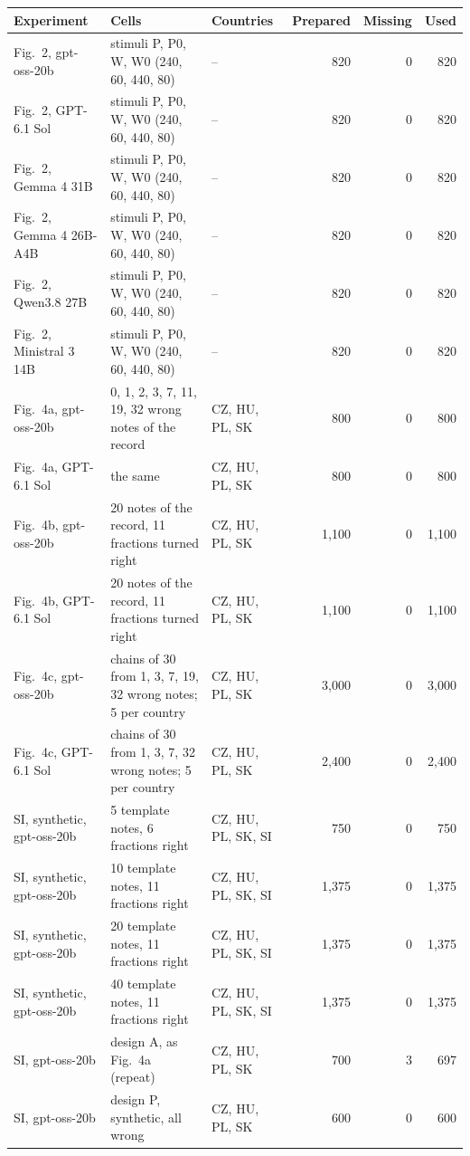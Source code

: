 \begin{tabular}{lp{5.4cm}lrrr}
\toprule
Experiment & Cells & Countries & Prepared & Missing & Used \\
\midrule
Fig.~2, gpt-oss-20b & stimuli P, P0, W, W0 (240, 60, 440, 80) & -- & 820 & 0 & 820 \\
Fig.~2, GPT-6.1 Sol & stimuli P, P0, W, W0 (240, 60, 440, 80) & -- & 820 & 0 & 820 \\
Fig.~2, Gemma 4 31B & stimuli P, P0, W, W0 (240, 60, 440, 80) & -- & 820 & 0 & 820 \\
Fig.~2, Gemma 4 26B-A4B & stimuli P, P0, W, W0 (240, 60, 440, 80) & -- & 820 & 0 & 820 \\
Fig.~2, Qwen3.8 27B & stimuli P, P0, W, W0 (240, 60, 440, 80) & -- & 820 & 0 & 820 \\
Fig.~2, Ministral 3 14B & stimuli P, P0, W, W0 (240, 60, 440, 80) & -- & 820 & 0 & 820 \\
Fig.~4a, gpt-oss-20b & 0, 1, 2, 3, 7, 11, 19, 32 wrong notes of the record & CZ, HU, PL, SK & 800 & 0 & 800 \\
Fig.~4a, GPT-6.1 Sol & the same & CZ, HU, PL, SK & 800 & 0 & 800 \\
Fig.~4b, gpt-oss-20b & 20 notes of the record, 11 fractions turned right & CZ, HU, PL, SK & 1,100 & 0 & 1,100 \\
Fig.~4b, GPT-6.1 Sol & 20 notes of the record, 11 fractions turned right & CZ, HU, PL, SK & 1,100 & 0 & 1,100 \\
Fig.~4c, gpt-oss-20b & chains of 30 from 1, 3, 7, 19, 32 wrong notes; 5 per country & CZ, HU, PL, SK & 3,000 & 0 & 3,000 \\
Fig.~4c, GPT-6.1 Sol & chains of 30 from 1, 3, 7, 32 wrong notes; 5 per country & CZ, HU, PL, SK & 2,400 & 0 & 2,400 \\
SI, synthetic, gpt-oss-20b & 5 template notes, 6 fractions right & CZ, HU, PL, SK, SI & 750 & 0 & 750 \\
SI, synthetic, gpt-oss-20b & 10 template notes, 11 fractions right & CZ, HU, PL, SK, SI & 1,375 & 0 & 1,375 \\
SI, synthetic, gpt-oss-20b & 20 template notes, 11 fractions right & CZ, HU, PL, SK, SI & 1,375 & 0 & 1,375 \\
SI, synthetic, gpt-oss-20b & 40 template notes, 11 fractions right & CZ, HU, PL, SK, SI & 1,375 & 0 & 1,375 \\
SI, gpt-oss-20b & design A, as Fig.~4a (repeat) & CZ, HU, PL, SK & 700 & 3 & 697 \\
SI, gpt-oss-20b & design P, synthetic, all wrong & CZ, HU, PL, SK & 600 & 0 & 600 \\

\end{tabular}
